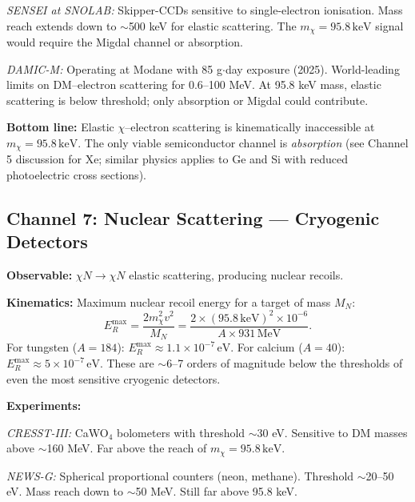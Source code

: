 \documentclass[12pt,a4paper]{article}
\newcommand{\keV}{\,\mathrm{keV}}
\newcommand{\eV}{\,\mathrm{eV}}
\begin{document}
\emph{SENSEI at SNOLAB:} Skipper-CCDs sensitive to single-electron
ionisation. Mass reach extends down to $\sim$500 keV for elastic
scattering. The $m_\chi = 95.8\keV$ signal would require the Migdal
channel or absorption.

\emph{DAMIC-M:} Operating at Modane with 85 g$\cdot$day exposure (2025).
World-leading limits on DM--electron scattering for 0.6--100 MeV.
At 95.8 keV mass, elastic scattering is below threshold; only
absorption or Migdal could contribute.

\textbf{Bottom line:} Elastic $\chi$--electron scattering is
kinematically inaccessible at $m_\chi = 95.8\keV$. The only viable
semiconductor channel is \emph{absorption} (see Channel 5 discussion
for Xe; similar physics applies to Ge and Si with reduced
photoelectric cross sections).

\begin{center}
\end{center}

\subsection{Channel 7: Nuclear Scattering --- Cryogenic Detectors}
\label{sec:nuclear}

\textbf{Observable:} $\chi N \to \chi N$ elastic scattering, producing
nuclear recoils.

\textbf{Kinematics:} Maximum nuclear recoil energy for a target of
mass $M_N$:
\begin{equation}
E_R^\mathrm{max} = \frac{2 m_\chi^2 v^2}{M_N}
= \frac{2 \times (95.8\keV)^2 \times 10^{-6}}{A \times 931\,\mathrm{MeV}}.
\end{equation}
For tungsten ($A = 184$): $E_R^\mathrm{max} \approx 1.1 \times 10^{-7}\eV$.
For calcium ($A = 40$): $E_R^\mathrm{max} \approx 5 \times 10^{-7}\eV$.
These are $\sim$6--7 orders of magnitude below the thresholds of
even the most sensitive cryogenic detectors.

\textbf{Experiments:}

\emph{CRESST-III:} CaWO$_4$ bolometers with threshold $\sim$30 eV.
Sensitive to DM masses above $\sim$160 MeV. Far above the reach
of $m_\chi = 95.8\keV$.

\emph{NEWS-G:} Spherical proportional counters (neon, methane).
Threshold $\sim$20--50 eV. Mass reach down to $\sim$50 MeV.
Still far above 95.8 keV.
\end{document}
